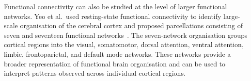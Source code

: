 Functional connectivity can also be studied at the level of larger functional networks.
Yeo et al.\ used resting-state functional connectivity to identify large-scale organisation of the cerebral cortex and proposed parcellations consisting of seven and seventeen functional networks~\cite{Yeo2011}. 
The seven-network organisation groups cortical regions into the visual, somatomotor, dorsal attention, ventral attention, limbic, frontoparietal, and default mode networks. 
These networks provide a broader representation of functional brain organisation and can be used to interpret patterns observed across individual cortical regions.